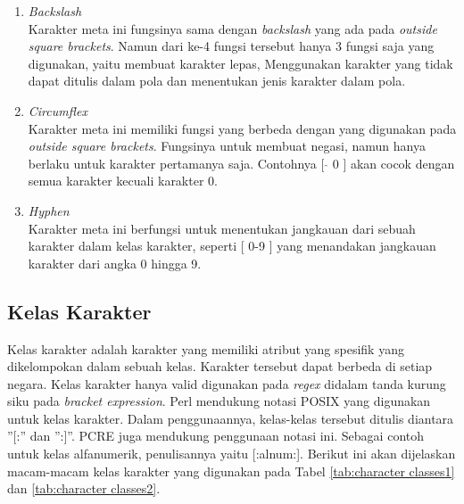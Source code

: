 \begin{enumerate}
	\item \textit{Backslash} \\
	Karakter meta ini fungsinya sama dengan \textit{backslash} yang ada pada \textit{outside square brackets}. Namun dari ke-4 fungsi tersebut hanya 3 fungsi saja yang digunakan, yaitu membuat karakter lepas, Menggunakan karakter yang tidak dapat ditulis dalam pola dan menentukan jenis karakter dalam pola.
	
	\item \textit{Circumflex} \\
	Karakter meta ini memiliki fungsi yang berbeda dengan yang digunakan pada \textit{outside square brackets}. Fungsinya untuk membuat negasi, namun hanya berlaku untuk karakter pertamanya saja. Contohnya [ $\hat{}$ 0 ] akan cocok dengan semua karakter kecuali karakter 0.
	
	\item \textit{Hyphen} \\
	Karakter meta ini berfungsi untuk menentukan jangkauan dari sebuah karakter dalam kelas karakter, seperti [ 0-9 ] yang menandakan jangkauan karakter dari angka 0 hingga 9.
	
\end{enumerate}
	
\subsection{Kelas Karakter}

Kelas karakter adalah karakter yang memiliki atribut yang spesifik yang dikelompokan dalam sebuah kelas. Karakter tersebut dapat berbeda di setiap negara. Kelas karakter hanya valid digunakan pada \textit{regex} didalam tanda kurung siku pada \textit{bracket expression}. Perl mendukung notasi POSIX yang digunakan untuk kelas karakter. Dalam penggunaannya, kelas-kelas tersebut ditulis diantara ''[:'' dan '':]''. PCRE juga mendukung penggunaan notasi ini. Sebagai contoh untuk kelas alfanumerik, penulisannya yaitu [:alnum:]. Berikut ini akan dijelaskan macam-macam kelas karakter yang digunakan pada Tabel \ref{tab:character classes1} dan \ref{tab:character classes2}.

